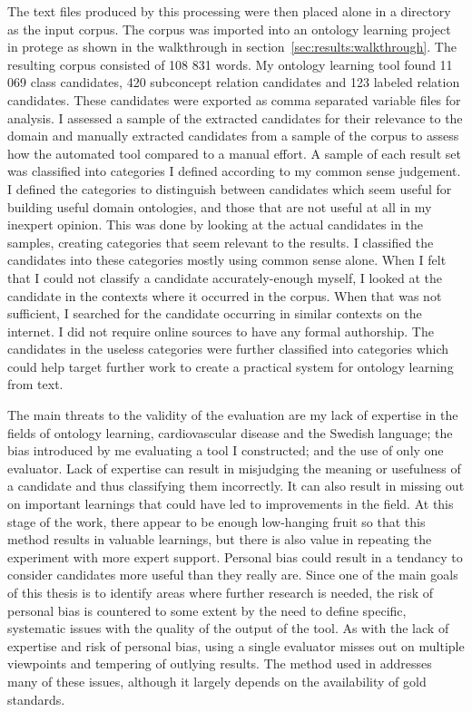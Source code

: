 \documentclass[a4paper]{report}
\begin{document}
The text files produced by this processing were then placed alone in a directory as the input corpus.
The corpus was imported into an ontology learning project in protege as shown in the walkthrough in section~\ref{sec:results:walkthrough}.
The resulting corpus consisted of 108 831 words.
My ontology learning tool found 11 069 class candidates, 420 subconcept relation candidates and 123 labeled relation candidates.
These candidates were exported as comma separated variable files for analysis.
I assessed a sample of the extracted candidates for their relevance to the domain and manually extracted candidates from a sample of the corpus to assess how the automated tool compared to a manual effort.
A sample of each result set was classified into categories I defined according to my common sense judgement.
I defined the categories to distinguish between candidates which seem useful for building useful domain ontologies, and those that are not useful at all in my inexpert opinion.
This was done by looking at the actual candidates in the samples, creating categories that seem relevant to the results.
I classified the candidates into these categories mostly using common sense alone.
When I felt that I could not classify a candidate accurately-enough myself, I looked at the candidate in the contexts where it occurred in the corpus.
When that was not sufficient, I searched for the candidate occurring in similar contexts on the internet.
I did not require online sources to have any formal authorship.
The candidates in the useless categories were further classified into categories which could help target further work to create a practical system for ontology learning from text.

The main threats to the validity of the evaluation are my lack of expertise in the fields of ontology learning, cardiovascular disease and the Swedish language; the bias introduced by me evaluating a tool I constructed; and the use of only one evaluator.
Lack of expertise can result in misjudging the meaning or usefulness of a candidate and thus classifying them incorrectly.
It can also result in missing out on important learnings that could have led to improvements in the field.
At this stage of the work, there appear to be enough low-hanging fruit so that this method results in valuable learnings, but there is also value in repeating the experiment with more expert support.
Personal bias could result in a tendancy to consider candidates more useful than they really are.
Since one of the main goals of this thesis is to identify areas where further research is needed, the risk of personal bias is countered to some extent by the need to define specific, systematic issues with the quality of the output of the tool.
As with the lack of expertise and risk of personal bias, using a single evaluator misses out on multiple viewpoints and tempering of outlying results.
The method used in \cite{Zouaq11OntoCmaps} addresses many of these issues, although it largely depends on the availability of gold standards.
\end{document}
